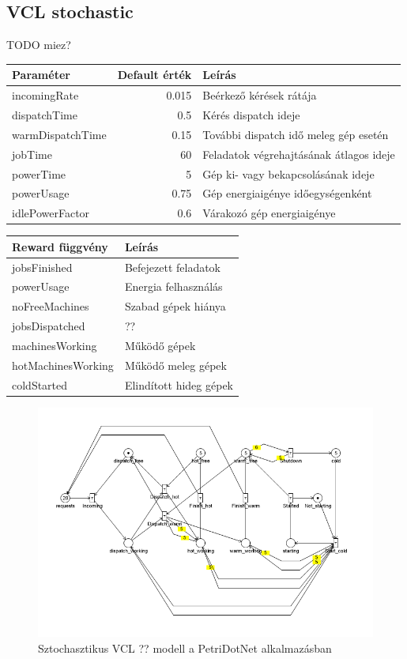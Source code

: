 \subsection{VCL stochastic}

TODO miez?
\begin{center}
	\begin{tabular}{lrl}
		\textbf{\textbf{Paraméter}} & \textbf{Default érték} & \textbf{Leírás} \\
		\hline
		incomingRate & 0.015 & Beérkező kérések rátája\\
		dispatchTime & 0.5 & Kérés dispatch ideje\\
		warmDispatchTime & 0.15 & További dispatch idő meleg gép esetén\\
		jobTime & 60 & Feladatok végrehajtásának átlagos ideje\\
		powerTime & 5 & Gép ki- vagy bekapcsolásának ideje\\
		powerUsage & 0.75 & Gép energiaigénye időegységenként\\
		idlePowerFactor & 0.6 & Várakozó gép energiaigénye\\
	\end{tabular}
	\quad
	\begin{tabular}{ll}
		\textbf{\textbf{Reward függvény}} & \textbf{Leírás}\\
		\hline
		jobsFinished & Befejezett feladatok\\
		powerUsage & Energia felhasználás\\
		noFreeMachines & Szabad gépek hiánya\\
		jobsDispatched & ??\\
		machinesWorking & Működő gépek\\
		hotMachinesWorking & Működő meleg gépek\\
		coldStarted & Elindított hideg gépek\\
	\end{tabular}
\end{center}

\begin{figure}
	\centering
	\includegraphics[width=140mm, keepaspectratio]{figures/vcl.png}
	\caption{Sztochasztikus VCL ?? modell a PetriDotNet alkalmazásban}
\end{figure}

